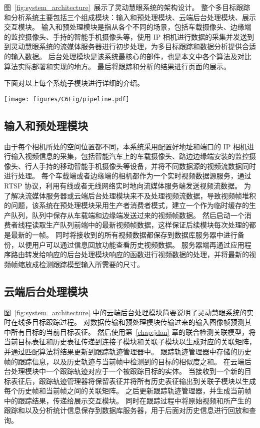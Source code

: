 图~\ref{fig:system_architecture}~展示了灵动慧眼系统的架构设计。
整个多目标跟踪和分析系统主要包括三个组成模块：输入和预处理模块、云端后台处理模块、展示交互模块。
输入和预处理模块是指从各个不同的场景，包括车载摄像头、边缘端的监控摄像头、手持的智能手机摄像头等，使用 IP 相机进行数据的采集并发送到到灵动慧眼系统的流媒体服务器进行初步处理，为多目标跟踪和数据分析提供合适的输入数据。
后台处理模块是该系统最核心的部件，也是本文中各个算法及对比算法实际部署和实现的地方。
最后将跟踪和分析的结果进行页面的展示。

下面对以上每个系统子模块进行详细的介绍。

\begin{figure*}[ht]
	\centering
	\texttt{[image: figures/C6Fig/pipeline.pdf]}
	\caption{灵动慧眼系统的架构设计}
	\label{fig:system_architecture}
\end{figure*}


\subsection{输入和预处理模块}
由于每个相机所处的空间位置都不同，本系统采用配置好地址和端口的 IP 相机进行输入视频信息的采集，包括智能汽车上的车载摄像头、路边边缘端安装的监控摄像头、行人手持的移动智能手机摄像头等设备，并将不同数据源的视频流数据同时进行处理。
每个车载端或者边缘端的相机都作为一个实时视频数据源服务，通过 RTSP 协议，利用有线或者无线网络实时地向流媒体服务端发送视频流数据。
为了解决流媒体服务器或云端后台处理模块来不及处理视频流数据，导致视频帧堆积的问题，该系统在预处理模块采用生产者消费者模式，建立一个作为临时缓存的生产队列，队列中保存从车载端和边缘端发送过来的视频帧数据。
然后启动一个消费者线程读取生产队列前端中的最新视频帧数据，这样保证后续模块每次处理的都是最新的一帧。
同时将接收到的所有视频数据都保存到数据库服务器中进行备份，以便用户可以通过信息回放功能查看历史视频数据。
服务器端再通过应用程序路由转发给响应的后台处理模块响应的函数进行视频数据的处理，并将最新的视频帧缩放成检测跟踪模型输入所需要的尺寸。


\subsection{云端后台处理模块}
图~\ref{fig:system_architecture} 中的云端后台处理模块简要说明了灵动慧眼系统的实时在线多目标跟踪过程。
对数据传输和预处理模块传输过来的输入图像帧预测其中所有目标的当前目标表征。
然后使用第~\ref{chap:jdan} 章的联合检测关联模型，将当前目标表征和历史表征传递到连接子模块和关联子模块以生成对应的关联矩阵，并通过匹配算法将结果更新到跟踪轨迹管理器中。
跟踪轨迹管理器中存储的历史帧的跟踪信息，以及历史轨迹与当前帧中检测到的目标的相似度之和。
在云端后台处理模块中一个跟踪轨迹对应于一个被跟踪目标的实体。
当接收到一个新的目标表征后，跟踪轨迹管理器将保留表征并将所有历史表征输出到关联子模块以生成每个历史帧和当前帧之间的关联矩阵。
之后更新跟踪轨迹管理器，并生成当前帧中的跟踪结果，传递给展示交互模块。
同时在跟踪过程中将原始视频和所产生的跟踪和以及分析统计信息保存到数据库服务器，用于后面对历史信息进行回放和查询。

